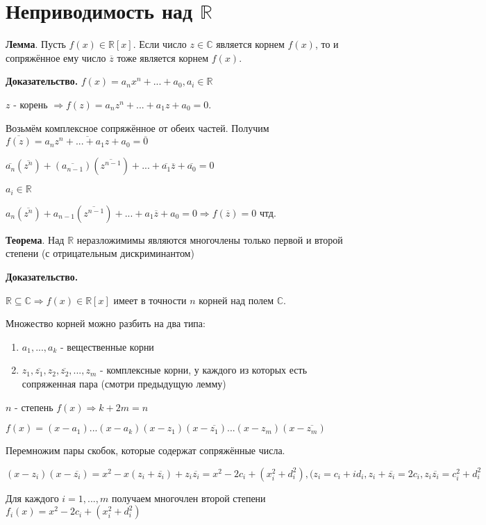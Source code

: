 \documentclass[a4paper]{article}
\author{Васильев Павел}
\begin{document}
\section*{Неприводимость над $\mathbb{R}$}

\begin{htheorem}\textbf{Лемма}.
Пусть $f(x) \in \mathbb{R}[x]$. Если число $z \in \mathbb{C}$ является корнем $f(x)$, то и сопряжённое ему число $\overline{z}$ тоже является корнем $f(x)$.
\end{htheorem}

\begin{hproof}\textbf{Доказательство.}
$f(x) = a_nx^n + ... + a_0, a_i \in \mathbb{R}$

$z$ - корень $\Rightarrow f(z) = a_nz^n + ... + a_1z+a_0 = 0$.

Возьмём комплексное сопряжённое от обеих частей. Получим $ \overline{f(z)} = \overline{a_nz^n + ... + a_1z+a_0} = \overline{0}$

$\overline{a_n}( \overline{z^n})+( \overline{a_{n-1}})(\overline{z^{n-1}}) + ... + \overline{a_1} \overline{z} + \overline{a_0} = 0$

$a_i \in \mathbb{R}$

$a_n( \overline{z^n}) +a_{n-1}( \overline{z^{n-1}}) + ... + a_1 \overline{z} + a_0 = 0 \Rightarrow f( \overline{z}) = 0$ чтд.

\end{hproof}

\begin{htheorem}\textbf{Теорема}.
Над $\mathbb{R}$ неразложимимы являются многочлены только первой и второй степени (с отрицательным дискриминантом)

\end{htheorem}
\begin{hproof}\textbf{Доказательство.}

$\mathbb{R} \subseteq \mathbb{C} \Rightarrow f(x) \in \mathbb{R}[x]$ имеет в точности $n$ корней над полем $\mathbb{C}$.

Множество корней можно разбить на два типа:
\begin{enumerate}
\item $a_1, ..., a_k$ - вещественные корни
\item $z_1, \overline{z_1}, z_2, \overline{z_2}, ..., z_m$ - комплексные корни, у каждого из которых есть сопряженная пара (смотри предыдущую лемму)
\end{enumerate}

$n$ - степень $f(x) \Rightarrow k+2m = n$

$f(x) = (x-a_1)...(x-a_k)(x-z_1)(x-\overline{z_1})...(x-z_m)(x- \overline{z_m})$

Перемножим пары скобок, которые содержат сопряжённые числа.

$(x-z_i)(x-\overline{z_i}) = x^2 - x(z_i + \overline{z_i}) + z_i \overline{z_i} = x^2 - 2c_i + (x_i^2 + d_i^2), (z_i = c_i + id_i, z_i + \overline{z_i} = 2c_i, z_i \overline{z_i} = c_i^2 + d_i^2$

Для каждого $i = 1, ..., m$ получаем многочлен второй степени $f_i(x) = x^2 - 2c_i + (x_i^2 + d_i^2)$
\end{hproof}
\end{document}
